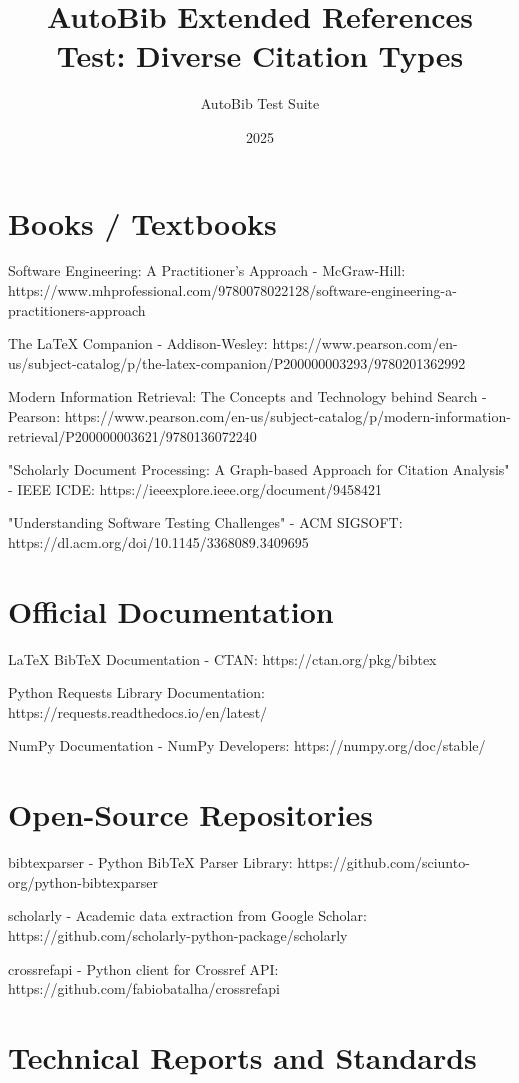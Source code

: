 \documentclass[12pt]{article}
\title{AutoBib Extended References Test: Diverse Citation Types}
\author{AutoBib Test Suite}
\date{2025}
\begin{document}
\maketitle
\onehalfspacing

\section{Books / Textbooks}
Software Engineering: A Practitioner's Approach - McGraw-Hill:
https://www.mhprofessional.com/9780078022128/software-engineering-a-practitioners-approach

The LaTeX Companion - Addison-Wesley:
https://www.pearson.com/en-us/subject-catalog/p/the-latex-companion/P200000003293/9780201362992

 Modern Information Retrieval: The Concepts and Technology behind Search - Pearson:
https://www.pearson.com/en-us/subject-catalog/p/modern-information-retrieval/P200000003621/9780136072240

"Scholarly Document Processing: A Graph-based Approach for Citation Analysis" - IEEE ICDE:
https://ieeexplore.ieee.org/document/9458421

"Understanding Software Testing Challenges" - ACM SIGSOFT:
https://dl.acm.org/doi/10.1145/3368089.3409695

\section{Official Documentation}
LaTeX BibTeX Documentation - CTAN:
https://ctan.org/pkg/bibtex

Python Requests Library Documentation:
https://requests.readthedocs.io/en/latest/

NumPy Documentation - NumPy Developers:
https://numpy.org/doc/stable/

\section{Open-Source Repositories}
bibtexparser - Python BibTeX Parser Library:
https://github.com/sciunto-org/python-bibtexparser

 scholarly - Academic data extraction from Google Scholar:
https://github.com/scholarly-python-package/scholarly

 crossrefapi - Python client for Crossref API:
https://github.com/fabiobatalha/crossrefapi

\section{Technical Reports and Standards}
\end{document}
